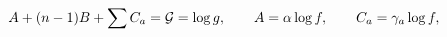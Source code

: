 \begin{equation}
A+(n-1)B+\sum C_a={\cal G}=\log g,\qquad A=\alpha\log f,\qquad C_a=\gamma_a
\log f,
\end{equation}


